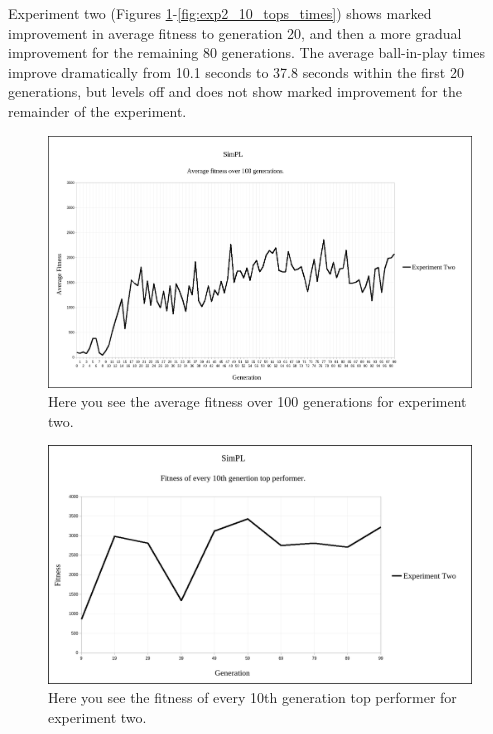 \documentclass[a4paper,10pt]{article}
\begin{document}
Experiment two (Figures \ref{fig:exp2_avg_fit}-\ref{fig:exp2_10_tops_times}) shows marked improvement in average fitness to generation 20, and then a more gradual improvement for the remaining 80 generations. The average ball-in-play times improve dramatically from 10.1 seconds to 37.8 seconds within the first 20 generations, but levels off and does not show marked improvement for the remainder of the experiment.

\begin{figure}[H]  
  \centering
  \includegraphics[width=1\textwidth]{figures/exp2_avg_fit.png}
  \caption{Here you see the average fitness over 100 generations for experiment two.}
  \label{fig:exp2_avg_fit}
\end{figure}

\begin{figure}[H]  
  \centering
  \includegraphics[width=1\textwidth]{figures/exp2_10_tops.png}
  \caption{Here you see the fitness of every 10th generation top performer for experiment two.}
  \label{fig:exp2_10_tops}
\end{figure}
\end{document}
